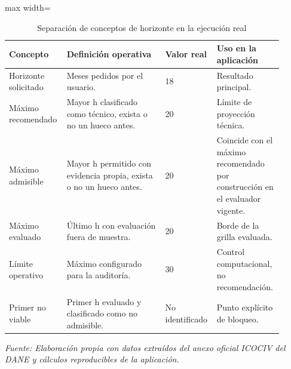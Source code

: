 \begin{table}[H]
\centering
\caption{Separación de conceptos de horizonte en la ejecución real}
\label{tab:ejemplo_resumen_horizontes_vias_urbanas}
\scriptsize
\begin{adjustbox}{max width=\linewidth}
\begin{tabular}{p{0.20\linewidth}p{0.35\linewidth}p{0.14\linewidth}p{0.22\linewidth}}
\toprule
Concepto & Definición operativa & Valor real & Uso en la aplicación \\
\midrule
Horizonte solicitado & Meses pedidos por el usuario. & 18 & Resultado principal. \\
Máximo recomendado & Mayor h clasificado como técnico, exista o no un hueco antes. & 20 & Límite de proyección técnica. \\
Máximo admisible & Mayor h permitido con evidencia propia, exista o no un hueco antes. & 20 & Coincide con el máximo recomendado por construcción en el evaluador vigente. \\
Máximo evaluado & Último h con evaluación fuera de muestra. & 20 & Borde de la grilla evaluada. \\
Límite operativo & Máximo configurado para la auditoría. & 30 & Control computacional, no recomendación. \\
Primer no viable & Primer h evaluado y clasificado como no admisible. & No identificado & Punto explícito de bloqueo. \\
\bottomrule
\end{tabular}
\end{adjustbox}
\par\footnotesize\textit{Fuente: Elaboración propia con datos extraídos del anexo oficial ICOCIV del DANE y cálculos reproducibles de la aplicación.}
\end{table}
